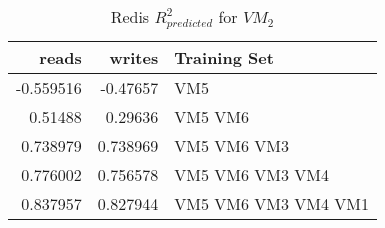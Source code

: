 \begin{table}
\centering
\caption{Redis $R_{predicted}^2$ for $VM_2$}
\begin{tabular}{|r|r|l|} \hline
reads&writes&Training Set\\ \hline
-0.559516 & -0.47657  & VM5 \\ \hline 
0.51488 & 0.29636  & VM5 VM6 \\ \hline 
0.738979 & 0.738969  & VM5 VM6 VM3 \\ \hline 
0.776002 & 0.756578  & VM5 VM6 VM3 VM4 \\ \hline 
0.837957 & 0.827944  & VM5 VM6 VM3 VM4 VM1 \\ \hline 
\hline\end{tabular}
\label{table:redis4}
\end{table}
 


